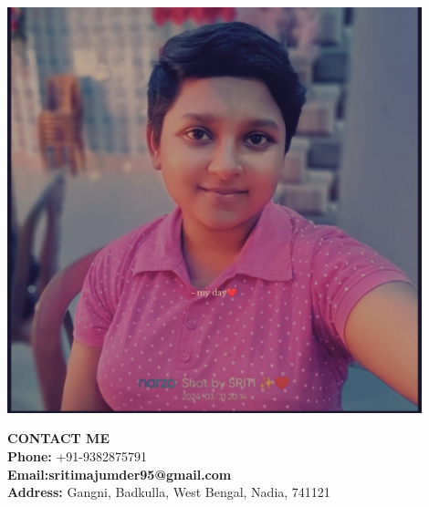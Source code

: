 \documentclass[12pt]{article}
\begin{document}
\noindent
\begin{minipage}{0.3\textwidth}
    \vspace{0.5cm}
    \includegraphics[width=0.9\textwidth]{.jpg}  %
    
    \vspace{0.5cm}
    \colorbox{
        \begin{minipage}{\textwidth}
            \vspace{0.3cm}
            \textbf{PROFILE} \\
            Bachelor in Computer Application student. I consider myself a responsible and orderly person.\\
            I am looking forward to my first work experience.
            \vspace{0.3cm}
        \end{minipage}
    }
    
    \vspace{0.5cm}
    {
        \begin{minipage}{\textwidth}
            \vspace{0.3cm}
            \textbf{CONTACT ME} \\
            \textbf{Phone:} +91-9382875791 \\
            \textbf{Email:sritimajumder95@gmail.com} \\
            \textbf{Address:} Gangni, Badkulla, West Bengal, Nadia, 741121 \\
            \vspace{0.3cm}
        \end{minipage}
    }
\end{minipage}
\end{document}

